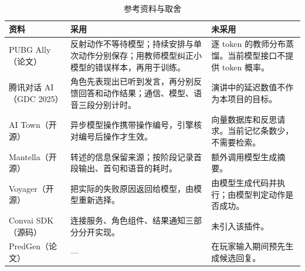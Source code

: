 \documentclass[11pt]{article}
\begin{document}
\begin{table}[H]
\small
\begin{tabularx}{\textwidth}{@{}l L L@{}}
\toprule
\textbf{资料} & \textbf{采用} & \textbf{未采用} \\
\midrule
PUBG Ally（论文） & 反射动作不等待模型；持续安排与单次动作分别保存；用教师模型纠正小模型的错误样本，再用于训练。 & 逐 token 的教师分布蒸馏。当前模型接口不提供 token 概率。 \\
腾讯对话 AI（GDC 2025） & 角色先表现出已听到发言，再分别反馈回答和动作结果；通信、模型、语音三段分别计时。 & 演讲中的延迟数值不作为本项目的目标。 \\
AI Town（开源） & 异步模型操作携带操作编号，引擎核对编号后操作才生效。 & 向量数据库和反思请求。当前记忆条数少，不需要检索。 \\
Mantella（开源） & 转述的信息保留来源；按阶段记录首段输出、首句和语音的耗时。 & 额外调用模型生成摘要。 \\
Voyager（开源） & 把实际的失败原因返回给模型，由模型重新选择。 & 由模型生成代码并执行；由模型判定动作是否成功。 \\
Convai SDK（源码） & 连接服务、角色组件、结果通知三部分分开实现。 & 未引入该插件。 \\
PredGen（论文） & — & 在玩家输入期间预先生成候选回复。 \\
\bottomrule
\end{tabularx}
\caption{参考资料与取舍}
\end{table}
\end{document}
